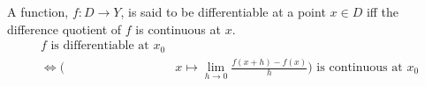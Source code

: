 \begin{definition}
    A function, $f:D\rightarrow Y$, is said to be differentiable at a point $x\in D$ iff the difference quotient of $f$ is continuous at $x$.
    \begin{align}
        \text{$f$ is differentiable at $x_0$}&\\
            \iff\bigg(
                &x\mapsto\lim_{h\rightarrow0}\frac{f(x+h)-f(x)}{h}
            \bigg)\text{ is continuous at $x_0$}
    \end{align}
\end{definition}
